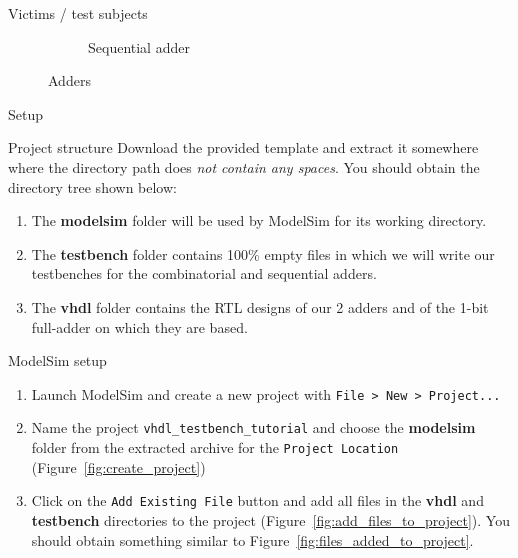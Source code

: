 \documentclass[lab]{course}
\begin{document}
\begin{section}{Victims / test subjects}
\begin{figure}[!h]
\begin{subfigure}[t]{0.3\textwidth}
            \caption{Sequential adder}
            \label{fig:adder_sequential_interface}
        \end{subfigure}
        \caption{Adders}
    \end{figure}
\end{section}

\clearpage

\begin{section}{Setup}
    \begin{subsection}{Project structure}
        Download the provided template and extract it somewhere where the directory path does \emph{not contain any spaces}. You should obtain the directory tree shown below: \\


        \begin{enumerate}
            \item The \textbf{modelsim} folder will be used by ModelSim for its working directory.
            \item The \textbf{testbench} folder contains 100\% empty files in which we will write our testbenches for the combinatorial and sequential adders.
            \item The \textbf{vhdl} folder contains the RTL designs of our 2 adders and of the 1-bit full-adder on which they are based.
        \end{enumerate}
    \end{subsection}

    \begin{subsection}{ModelSim setup}
        \begin{enumerate}
            \item Launch ModelSim and create a new project with \verb+File > New > Project...+

            \item Name the project \verb+vhdl_testbench_tutorial+ and choose the \textbf{modelsim} folder from the extracted archive for the \verb+Project Location+ (Figure~\ref{fig:create_project})

            \item Click on the \verb+Add Existing File+ button and add all files in the \textbf{vhdl} and \textbf{testbench} directories to the project (Figure~\ref{fig:add_files_to_project}). You should obtain something similar to Figure~\ref{fig:files_added_to_project}.


\end{enumerate}
\end{subsection}
\end{section}
\end{document}
